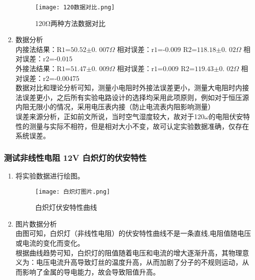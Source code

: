 \documentclass[dvipsnames, svgnames,a4paper,11pt]{article}
\begin{document}
\begin{enumerate}
				\begin{figure}[H]
					\centering
					\texttt{[image: 120数据对比.png]}
					\caption{120Ω两种方法数据对比}
					\label{120Ω两种方法数据对比}
				\end{figure}
				\item 数据分析\\
				     内接法结果：$\text{R1=50.52±0. 007}\Omega $
				     \hspace{0.4cm}相对误差：$\text{r1=-0.009}$
				     \hspace{0.4cm}$\text{R2=118.18±0. 02}\Omega$
				     \hspace{0.4cm} 相对误差：$\text{r2=-0.015}$\\
				     外接法结果：$\text{R1=51.47±0. 009}\Omega $
				     \hspace{0.4cm} 相对误差：$\text{r1=0.009}$
				     \hspace{0.4cm}  $\text{R2=119.43±0. 02}\Omega $
				     \hspace{0.4cm}相对误差：$\text{r2=-0.00475}$
				 \\数据对比和理论分析可知，测量小电阻时外接法误差更小，测量大电阻时内接法误差更小，之后所有实验电路设计的选择均采用此项原则，例如对于恒压源内阻无限小的情况，采用电压表内接（防止电流表内阻影响测量）
				 \\误差来源分析，正如前文所说，当时空气湿度较大，故对于120$\omega$的电阻伏安特性的测量与实际不相符，但是相对大小不变，故可认定实验数据准确，仅存在系统误差。
				     
				
				
			
		
		
	\end{enumerate}
	
	\subsubsection{测试非线性电阻 12V 白炽灯的伏安特性}
	\begin{enumerate}
		\item 将实验数据进行绘图。
			\begin{figure}[H]
			\centering
			\texttt{[image: 白炽灯图片.png]}
			\caption{白炽灯伏安特性曲线}
			\label{白炽灯伏安特性曲线}
		\end{figure}
		\item 图片数据分析\\
		由图可知，白炽灯（非线性电阻）的伏安特性曲线不是一条直线,电阻值随电压或电流的变化而变化。\\
		根据曲线趋势可知，白炽灯的阻值随着电压和电流的增大逐渐升高，其物理意义为：电压电流升高导致灯丝的温度升高，从而加剧了分子的不规则运动，从而影响了金属的导电能力，故会导致阻值升高。
		
	\end{enumerate}
	
\end{document}
